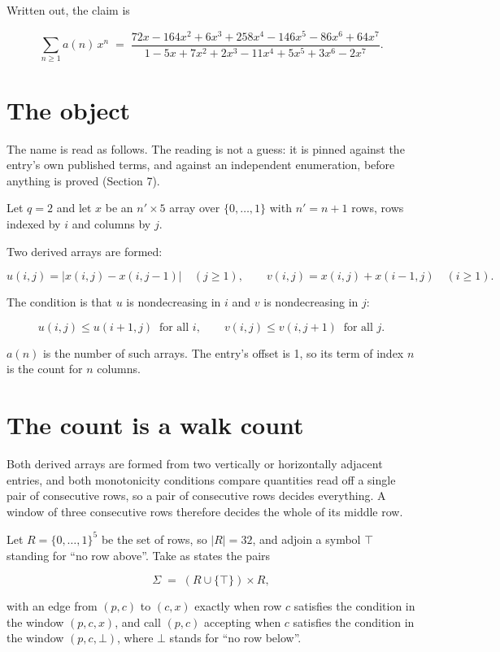 \documentclass[11pt]{article}
\theoremstyle{definition}
\begin{document}
Written out, the claim is

\[\sum_{n \ge 1} a(n)\,x^n \;=\; \frac{72x - 164x^{2} + 6x^{3} + 258x^{4} - 146x^{5} - 86x^{6} + 64x^{7}}{1 - 5x + 7x^{2} + 2x^{3} - 11x^{4} + 5x^{5} + 3x^{6} - 2x^{7}}.\]

\section{The object}

The name is read as follows. The reading is not a guess: it is pinned against the entry's own published terms, and against an independent enumeration, before anything is proved (Section 7).

Let $q = 2$ and let $x$ be an $n' \times 5$ array over $\{0,\dots,1\}$ with $n' = n + 1$ rows, rows indexed by $i$ and columns by $j$.

Two derived arrays are formed:

\[u(i,j) = \lvert x(i,j) - x(i,j{-}1)\rvert\quad (j \ge 1), \qquad v(i,j) = x(i,j) + x(i{-}1,j)\quad (i \ge 1).\]

The condition is that $u$ is nondecreasing in $i$ and $v$ is nondecreasing in $j$:

\[u(i,j) \le u(i{+}1,j) \ \text{ for all } i, \qquad v(i,j) \le v(i,j{+}1) \ \text{ for all } j.\]

$a(n)$ is the number of such arrays. The entry's offset is 1, so its term of index $n$ is the count for $n$ columns.

\section{The count is a walk count}

Both derived arrays are formed from two vertically or horizontally adjacent entries, and both monotonicity conditions compare quantities read off a single pair of consecutive rows, so a pair of consecutive rows decides everything. A window of three consecutive rows therefore decides the whole of its middle row.

Let $R = \{0,\dots,1\}^{5}$ be the set of rows, so $|R| = 32$, and adjoin a symbol $\top$ standing for ``no row above''. Take as states the pairs

\[\Sigma \;=\; (R \cup \{\top\}) \times R,\]

with an edge from $(p,c)$ to $(c,x)$ exactly when row $c$ satisfies the condition in the window $(p,c,x)$, and call $(p,c)$ accepting when $c$ satisfies the condition in the window $(p,c,\bot)$, where $\bot$ stands for ``no row below''.
\end{document}
